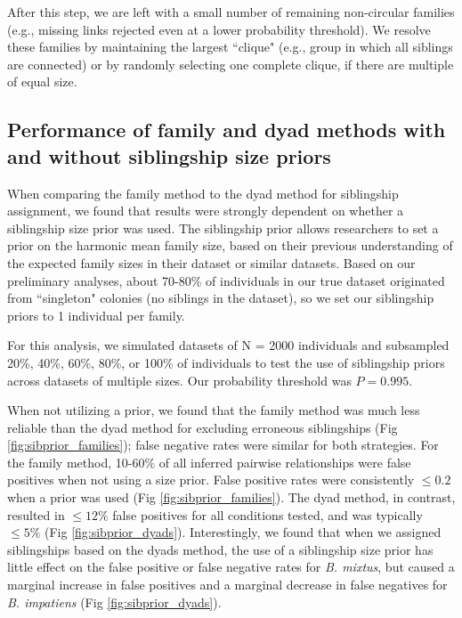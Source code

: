 \documentclass[12pt]{article}
\begin{document}
After this step, we are left with a small number of remaining non-circular families (e.g., missing links rejected even at a lower probability threshold). We resolve these families by maintaining the largest ``clique" (e.g., group in which all siblings are connected) or by randomly selecting one complete clique, if there are multiple of equal size.


\subsection{Performance of family and dyad methods with and without siblingship size priors}

When comparing the family method to the dyad method for siblingship assignment, we found that results were strongly dependent on whether a siblingship size prior was used. The siblingship prior allows researchers to set a prior on the harmonic mean family size, based on their previous understanding of the expected family sizes in their dataset or similar datasets. Based on our preliminary analyses, about 70-80\% of individuals in our true dataset originated from ``singleton" colonies (no siblings in the dataset), so we set our siblingship priors to 1 individual per family.

For this analysis, we simulated datasets of N = 2000 individuals and subsampled 20\%, 40\%, 60\%, 80\%, or 100\% of individuals to test the use of siblingship priors across datasets of multiple sizes. Our probability threshold was $P = 0.995$. 

When not utilizing a prior, we found that the family method was much less reliable than the dyad method for excluding erroneous siblingships (Fig \ref{fig:sibprior_families}); false negative rates were similar for both strategies. For the family method, 10-60\% of all inferred pairwise relationships were false positives when not using a size prior. False positive rates were consistently $\le 0.2$ when a prior was used (Fig \ref{fig:sibprior_families}). The dyad method, in contrast, resulted in $\le 12\%$ false positives for all conditions tested, and was typically $\le 5\%$ (Fig \ref{fig:sibprior_dyads}). Interestingly, we found that when we assigned siblingships based on the dyads method, the use of a siblingship size prior has little effect on the false positive or false negative rates for \emph{B. mixtus}, but caused a marginal increase in false positives and a marginal decrease in false negatives for \emph{B. impatiens} (Fig \ref{fig:sibprior_dyads}). 
\end{document}
